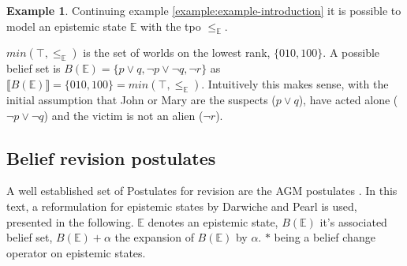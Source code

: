 \documentclass[english, 12pt]{scrartcl}
\theoremstyle{definition}
\newtheorem{example}{Example}
\theoremstyle{definition}
\theoremstyle{definition}
\newcommand{\modelsOf}[1]{\llbracket #1 \rrbracket}
\begin{document}
\begin{example}
    Continuing example \ref{example:example-introduction} it is possible to model an epistemic state $\mathbb{E}$ with the tpo $\leq_{\mathbb{E}}$.
    
    $min(\top, \leq_{\mathbb{E}})$ is the set of worlds on the lowest rank, $\{010, 100\}$. A possible belief set is $B(\mathbb{E}) = \{p \vee q, \neg p \vee \neg q, \neg r\}$ as $\modelsOf{B(\mathbb{E})} = \{010, 100\} = min(\top, \leq_{\mathbb{E}})$. Intuitively this makes sense, with the initial assumption that John or Mary are the suspects ($p \vee q$), have acted alone ($\neg p \vee \neg q$) and the victim is not an alien ($\neg r$).
\end{example}




\subsection{Belief revision postulates}
\label{chapter:dp-agm-postulates}
A well established set of Postulates for revision are the AGM postulates \cite{Alchourron1985}. In this text, a reformulation for epistemic states by Darwiche and Pearl \cite{Darwiche1997} is used, presented in the following. $\mathbb{E}$ denotes an epistemic state, $B(\mathbb{E})$ it's associated belief set, $B(\mathbb{E}) + \alpha$ the expansion of $B(\mathbb{E})$ by $\alpha$. $\ast$ being a belief change operator on epistemic states. 
\end{document}

